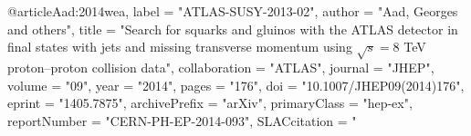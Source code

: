 @article{Aad:2014wea,
      label          = "ATLAS-SUSY-2013-02",
      author         = "Aad, Georges and others",
      title          = "{Search for squarks and gluinos with the ATLAS detector
                        in final states with jets and missing transverse momentum
                        using $\sqrt{s}=8$ TeV proton--proton collision data}",
      collaboration  = "ATLAS",
      journal        = "JHEP",
      volume         = "09",
      year           = "2014",
      pages          = "176",
      doi            = "10.1007/JHEP09(2014)176",
      eprint         = "1405.7875",
      archivePrefix  = "arXiv",
      primaryClass   = "hep-ex",
      reportNumber   = "CERN-PH-EP-2014-093",
      SLACcitation   = "%
}

